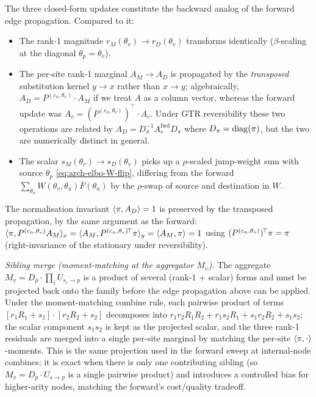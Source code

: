 The three closed-form updates constitute the backward analog of the
forward edge propagation. Compared to it:
\begin{itemize}[leftmargin=1.6em]
\item The rank-1 magnitude $r_M(\theta_v) \to r_D(\theta_v)$ transforms
    identically ($\beta$-scaling at the diagonal $\theta_p = \theta_v$).
\item The per-site rank-1 marginal $A_M \to A_D$ is propagated by the
    \emph{transposed} substitution kernel $y \to x$ rather than
    $x \to y$; algebraically, $A_D = P^{(c_n, \theta_v)} \cdot A_M$ if
    we treat $A$ as a column vector, whereas the forward update was
    $A_v = (P^{(c_n, \theta_v)})^{\!\top} \cdot A_c$. Under GTR
    reversibility these two operations are related by
    $A_D = D_{\pi}^{-1} A_v^{\text{fwd}} D_\pi$ where $D_\pi = \mathrm{diag}(\pi)$,
    but the two are numerically distinct in general.
\item The scalar $s_M(\theta_v) \to s_D(\theta_v)$ picks up a
    $\rho$-scaled jump-weight sum with source $\theta_p$
    \eqref{eq:arch-elbo-W-flip}, differing from the forward
    $\sum_{\theta_u} W(\theta_v, \theta_u) \bar F(\theta_u)$ by the
    $\rho$-swap of source and destination in $W$.
\end{itemize}
The normalisation invariant $\langle \pi, A_D \rangle = 1$ is
preserved by the transposed propagation, by the same argument as the
forward: $\langle \pi, P^{(c_n, \theta_v)} A_M \rangle_x =
\langle A_M, P^{(c_n, \theta_v)\!\top} \pi \rangle_y =
\langle A_M, \pi \rangle = 1$ using
$(P^{(c_n, \theta_v)})^{\!\top} \pi = \pi$ (right-invariance of the
stationary under reversibility).

\emph{Sibling merge (moment-matching at the aggregator $M_v$).} The
aggregate $M_v = D_p \cdot \prod_i U_{s_i \to p}$ is a product of
several (rank-1 + scalar) forms and must be projected back onto the
family before the edge propagation above can be applied. Under the
moment-matching combine rule, each pairwise product
of terms $[r_1 R_1 + s_1] \cdot [r_2 R_2 + s_2]$ decomposes into
$r_1 r_2 R_1 R_2 + r_1 s_2 R_1 + s_1 r_2 R_2 + s_1 s_2$; the scalar
component $s_1 s_2$ is kept as the projected scalar, and the three
rank-1 residuals are merged into a single per-site marginal by
matching the per-site $\langle \pi, \cdot \rangle$-moments. This is
the same projection used in the forward sweep at internal-node
combines; it is exact when there is only one contributing sibling
(so $M_v = D_p \cdot U_{s \to p}$ is a single pairwise product) and
introduces a controlled bias for higher-arity nodes, matching the
forward's cost/quality tradeoff.

